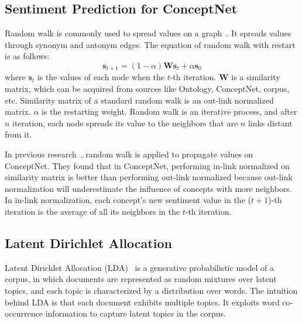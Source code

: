\subsection{Sentiment Prediction for ConceptNet}
Random walk is commonly used to spread values on a graph~\cite{Wu:relSelect14,Hassan:ACL10,Xu:COLING10,Cambria:AAAI10}. It spreads values through synonym and antonym edges. The equation of random walk with restart is as follows:
\begin{equation}
\label{eq:rndWalk}
\boldsymbol{s}_{t+1} = (1-\alpha)\boldsymbol{W}\boldsymbol{s}_t + \alpha\boldsymbol{s}_0
\end{equation}
where $\boldsymbol{s}_t$ is the values of each node when the $t$-th iteration. $\boldsymbol{W}$ is a similarity matrix, which can be acquired from sources like Ontology, ConceptNet, corpus, etc. Similarity matrix of a standard random walk is an out-link normalized matrix. $\alpha$ is the restarting weight. Random walk is an iterative process, and after $n$ iteration, each node spreads its value to the neighbors that are $n$ links distant from it.

In previous research~\cite{Tsai:IEEE13, Wu:relSelect14}, random walk is applied to propagate values on ConceptNet. They found that in ConceptNet, performing in-link normalized on similarity matrix is better than performing out-link normalized because out-link normalization will underestimate the influence of concepts with more neighbors. In in-link normalization, each concept's new sentiment value in the ($t+1$)-th iteration is the average of all its neighbors in the $t$-th iteration.

\subsection{Latent Dirichlet Allocation}
Latent Dirichlet Allocation (LDA)~\cite{Blei:LDA03} is a generative probabilistic model of a corpus, in which documents are represented as random mixtures over latent topics, and each topic is characterized by a distribution over words. The intuition behind LDA is that each document exhibits multiple topics. It exploits word co-occurrence information to capture latent topics in the corpus.


